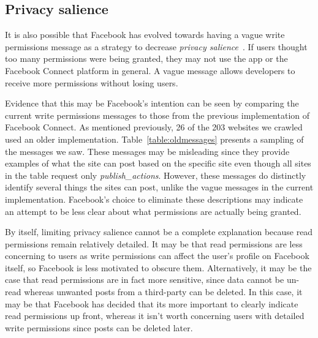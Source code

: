 \documentclass{sig-alternate}
\begin{document}
\subsection{Privacy salience}

It is also possible that Facebook has evolved towards having a vague write permissions message as a strategy to decrease \textit{privacy salience}~\cite{BP09}. If users thought too many permissions were being granted, they may not use the app or the Facebook Connect platform in general. A vague message allows developers to receive more permissions without losing users.

Evidence that this may be Facebook's intention can be seen by comparing the current write permissions messages to those from the previous implementation of Facebook Connect. As mentioned previously, 26 of the 203 websites we crawled used an older implementation. Table~\ref{table:oldmessages} presents a sampling of the messages we saw. These messages may be misleading since they provide examples of what the site can post based on the specific site even though all sites in the table request only \emph{publish\_actions}. However, these messages do distinctly identify several things the sites can post, unlike the vague messages in the current implementation. Facebook's choice to eliminate these descriptions may indicate an attempt to be less clear about what permissions are actually being granted.

By itself, limiting privacy salience cannot be a complete explanation because read permissions remain relatively detailed.
It may be that read permissions are less concerning to users as write permissions can affect the user's profile on Facebook itself, so Facebook is less motivated to obscure them.
Alternatively, it may be the case that read permissions are in fact more sensitive, since data cannot be un-read whereas unwanted posts from a third-party can be deleted.
In this case, it may be that Facebook has decided that its more important to clearly indicate read permissions up front, whereas it isn't worth concerning users with detailed write permissions since posts can be deleted later.
\end{document}
